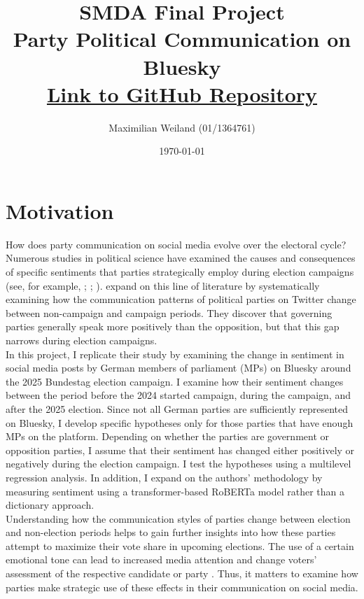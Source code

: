 \documentclass{article}
\title{SMDA Final Project \\[0.5em]
Party Political Communication on Bluesky \\[0.5em]
\large \href{https://github.com/MaximilianWeiland/SMDA_Final_Project}{Link to GitHub Repository}}
\author{Maximilian Weiland (01/1364761)}
\date{\today}
\begin{document}
\maketitle

\section{Motivation}
How does party communication on social media evolve over the electoral cycle? Numerous studies in political science have examined the causes and consequences of specific sentiments that parties strategically employ during election campaigns (see, for example, \textcite{crabtree_it_2020}; \textcite{fridkin_variability_2011}; \textcite{sides_voters_2010}). \textcite{castanho_silva_modulation_2024} expand on this line of literature by systematically examining how the communication patterns of political parties on Twitter change between non-campaign and campaign periods. They discover that governing parties generally speak more positively than the opposition, but that this gap narrows during election campaigns. \\
\noindent In this project, I replicate their study by examining the change in sentiment in social media posts by German members of parliament (MPs) on Bluesky around the 2025 Bundestag election campaign. I examine how their sentiment changes between the period before the 2024 started campaign, during the campaign, and after the 2025 election. Since not all German parties are sufficiently represented on Bluesky, I develop specific hypotheses only for those parties that have enough MPs on the platform. Depending on whether the parties are government or opposition parties, I assume that their sentiment has changed either positively or negatively during the election campaign. I test the hypotheses using a multilevel regression analysis. In addition, I expand on the authors' methodology by measuring sentiment using a transformer-based RoBERTa model rather than a dictionary approach. \\
\noindent Understanding how the communication styles of parties change between election and non-election periods helps to gain further insights into how these parties attempt to maximize their vote share in upcoming elections. The use of a certain emotional tone can lead to increased media attention \parencite{maier_roaring_2020} and change voters' assessment of the respective candidate or party \parencite{krupnikov_accentuating_2015}. Thus, it matters to examine how parties make strategic use of these effects in their communication on social media. \\
\end{document}
